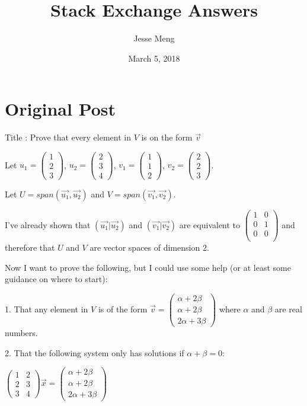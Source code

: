 \documentclass{article}
\title{Stack Exchange Answers}
\author{Jesse Meng }
\date{March 5, 2018}
\begin{document}
\maketitle

\section{Original Post}
Title : Prove that every element in $V$ is on the form $\vec{v}$

Let $u_1=\begin{pmatrix}1\\ 2\\ 3\end{pmatrix}$, $u_2=\begin{pmatrix}2\\ 3\\ 4\end{pmatrix}$, $v_1=\begin{pmatrix}1\\ 1\\ 2\end{pmatrix}$, $v_2=\begin{pmatrix}2\\ 2\\ 3\end{pmatrix}$.

Let $U=span(\vec{u_1},\vec{u_2})$ and $V=span(\vec{v_1},\vec{v_2})$.

I've already shown that $(\vec{u_1}|\vec{u_2})$ and $(\vec{v_1}|\vec{v_2})$ are equivalent to $\begin{pmatrix}1 & 0\\ 0 & 1\\ 0 & 0\\ \end{pmatrix}$ and therefore that $U$ and $V$ are vector spaces of dimension 2.

Now I want to prove the following, but I could use some help (or at least some guidance on where to start):

1. That any element in $V$ is of the form $\vec{v}=\begin{pmatrix}\alpha + 2\beta\\ \alpha + 2\beta\\ 2\alpha + 3\beta\end{pmatrix}$ where $\alpha$ and $\beta$ are real numbers.

2. That the following system only has solutions if $\alpha+\beta=0$:

$\begin{pmatrix}1 & 2\\ 2 & 3\\ 3 & 4\end{pmatrix}\vec{x}=\begin{pmatrix}\alpha + 2\beta\\ \alpha + 2\beta\\ 2\alpha + 3\beta\end{pmatrix}$
\end{document}
